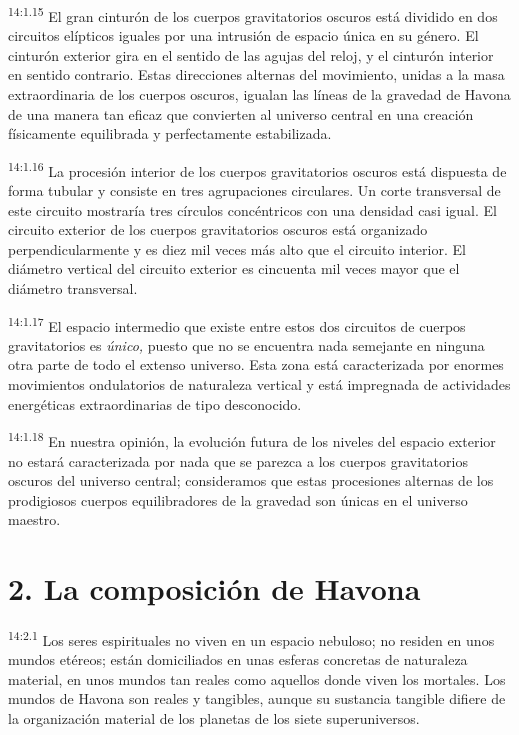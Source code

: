 \par
\textsuperscript{14:1.15} El gran cinturón de los cuerpos gravitatorios oscuros está dividido en dos circuitos elípticos iguales por una intrusión de espacio única en su género. El cinturón exterior gira en el sentido de las agujas del reloj, y el cinturón interior en sentido contrario. Estas direcciones alternas del movimiento, unidas a la masa extraordinaria de los cuerpos oscuros, igualan las líneas de la gravedad de Havona de una manera tan eficaz que convierten al universo central en una creación físicamente equilibrada y perfectamente estabilizada.

\par
\textsuperscript{14:1.16} La procesión interior de los cuerpos gravitatorios oscuros está dispuesta de forma tubular y consiste en tres agrupaciones circulares. Un corte transversal de este circuito mostraría tres círculos concéntricos con una densidad casi igual. El circuito exterior de los cuerpos gravitatorios oscuros está organizado perpendicularmente y es diez mil veces más alto que el circuito interior. El diámetro vertical del circuito exterior es cincuenta mil veces mayor que el diámetro transversal.

\par
\textsuperscript{14:1.17} El espacio intermedio que existe entre estos dos circuitos de cuerpos gravitatorios es \textit{único,} puesto que no se encuentra nada semejante en ninguna otra parte de todo el extenso universo. Esta zona está caracterizada por enormes movimientos ondulatorios de naturaleza vertical y está impregnada de actividades energéticas extraordinarias de tipo desconocido.

\par
\textsuperscript{14:1.18} En nuestra opinión, la evolución futura de los niveles del espacio exterior no estará caracterizada por nada que se parezca a los cuerpos gravitatorios oscuros del universo central; consideramos que estas procesiones alternas de los prodigiosos cuerpos equilibradores de la gravedad son únicas en el universo maestro.

\section*{2. La composición de Havona}
\par
\textsuperscript{14:2.1} Los seres espirituales no viven en un espacio nebuloso; no residen en unos mundos etéreos; están domiciliados en unas esferas concretas de naturaleza material, en unos mundos tan reales como aquellos donde viven los mortales. Los mundos de Havona son reales y tangibles, aunque su sustancia tangible difiere de la organización material de los planetas de los siete superuniversos.

